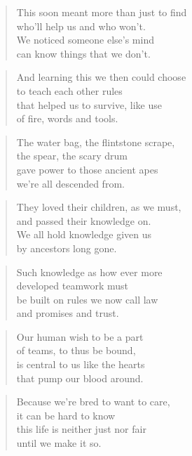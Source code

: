 \documentclass[10pt,a4paper]{article}
\begin{document}
\begin{paracol}{2}
\begin{verse}
This soon meant more than just to find\\
who’ll help us and who won’t.\\
We noticed someone else’s mind\\
can know things that we don’t.
\end{verse}

\begin{verse}
And learning this we then could choose\\
to teach each other rules\\
that helped us to survive, like use\\
of fire, words and tools.
\end{verse}

\begin{verse}
The water bag, the flintstone scrape,\\
the spear, the scary drum\\
gave power to those ancient apes\\
we’re all descended from.
\end{verse}

\begin{verse}
They loved their children, as we must,\\
and passed their knowledge on.\\
We all hold knowledge given us\\
by ancestors long gone.
\end{verse}

\begin{verse}
Such knowledge as how ever more\\
developed teamwork must\\
be built on rules we now call law\\
and promises and trust.
\end{verse}

\begin{verse}
Our human wish to be a part\\
of teams, to thus be bound,\\
is central to us like the hearts\\
that pump our blood around.
\end{verse}

\begin{verse}
Because we’re bred to want to care,\\
it can be hard to know\\
this life is neither just nor fair\\
until we make it so.
\end{verse}


\end{paracol}
\end{document}
